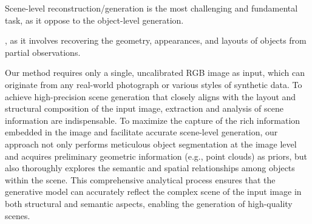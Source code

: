 Scene-level reconstruction/generation is the most challenging and fundamental task, as it oppose to the object-level generation.

, as it involves recovering the geometry, appearances, and layouts of objects from partial observations.

Our method requires only a single, uncalibrated RGB image as input, which can originate from any real-world photograph or various styles of synthetic data. To achieve high-precision scene generation that closely aligns with the layout and structural composition of the input image, extraction and analysis of scene information are indispensable. To maximize the capture of the rich information embedded in the image and facilitate accurate scene-level generation, our approach not only performs meticulous object segmentation at the image level and acquires preliminary geometric information (e.g., point clouds) as priors, but also thoroughly explores the semantic and spatial relationships among objects within the scene. This comprehensive analytical process ensures that the generative model can accurately reflect the complex scene of the input image in both structural and semantic aspects, enabling the generation of high-quality scenes.